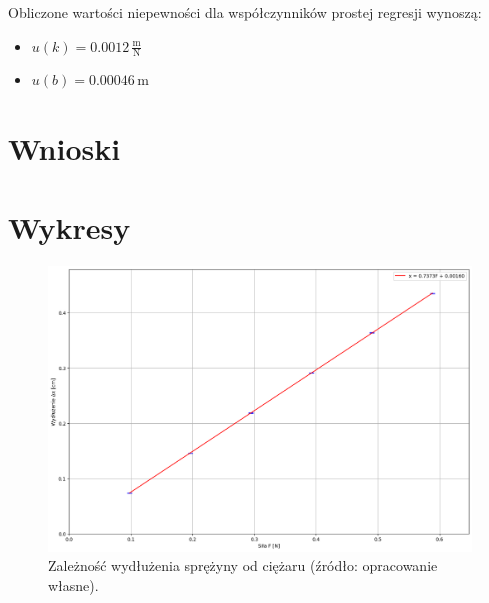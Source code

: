 \documentclass[a4paper,12pt]{article}
\begin{document}
Obliczone wartości niepewności dla współczynników prostej regresji wynoszą:

\begin{itemize}
    \setlength{\itemsep}{0em}
    \item $u(k) = 0.0012\,\frac{\text{m}}{\text{N}}$
    \item $u(b) = 0.00046\,\text{m}$
\end{itemize}


\section{Wnioski}

\section{Wykresy}

\begin{figure}[H]
    \centering
    \includegraphics[width=1.2\linewidth,angle=90]{2-x(F).png}
    \caption{Zależność wydłużenia sprężyny od ciężaru (źródło: opracowanie własne).}
    \label{fig:zaleznosci}
\end{figure}




\end{document}
